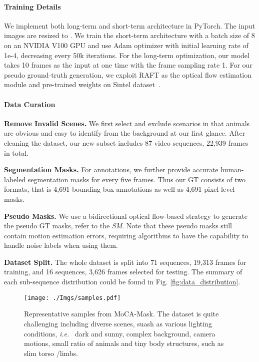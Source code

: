 \documentclass[10pt,twocolumn,letterpaper]{article}
\def\ie{\emph{i.e.}}
\begin{document}
\paragraph{Training Details}
We implement both long-term and short-term architecture in PyTorch. The input images are resized to .  We train the short-term architecture with a batch size of 8 on an NVIDIA V100 GPU and use Adam optimizer with initial learning rate of 1e-4, decreasing every 50k iterations. For the long-term optimization, our model takes 10 frames as the input at one time with the frame sampling rate 1.
For our pseudo ground-truth generation, we exploit RAFT \cite{teed2020raft} as the optical flow estimation module and pre-trained weights on Sintel dataset~\cite{Butler:ECCV:2012}.

\paragraph{Data Curation}
\begin{compactitem}
\item \textbf{Remove Invalid Scenes.} We first select and exclude scenarios in that animals are obvious and easy to identify from the background at our first glance. After cleaning the dataset, our new subset includes 87 video sequences, 22,939 frames in total.
\item \textbf{Segmentation Masks.} For annotations, we further provide accurate human-labeled segmentation masks for every five frames. Thus our  GT consists of two formats, that is 4,691 bounding box annotations as well as 4,691 pixel-level masks.
\item \textbf{Pseudo Masks.} We use a bidirectional optical flow-based strategy to generate the pseudo GT masks, refer to the \textit{SM}. Note that these pseudo masks still contain motion estimation errors, requiring algorithms to have the capability to handle noise labels when using them. \item \textbf{Dataset Split.} The whole dataset is split into 71 sequences, 19,313 frames for training, and 16 sequences, 3,626 frames selected for testing. The summary of each sub-sequence distribution could be found in Fig. \ref{fig:data_distribution}. 
\end{compactitem}


\begin{figure*}[!ht]
\begin{center}
\vspace{-5mm}
\texttt{[image: ./Imgs/samples.pdf]}
\end{center}
\vspace{-8mm}
\caption{Representative samples from MoCA-Mask. The dataset is quite challenging including diverse scenes, suash as various lighting conditions, \ie~ dark and sunny, complex background, camera motions, small ratio of animals and tiny body structures, such as slim torso /limbs.}
\label{fig:samples}
\end{figure*}
\end{document}
